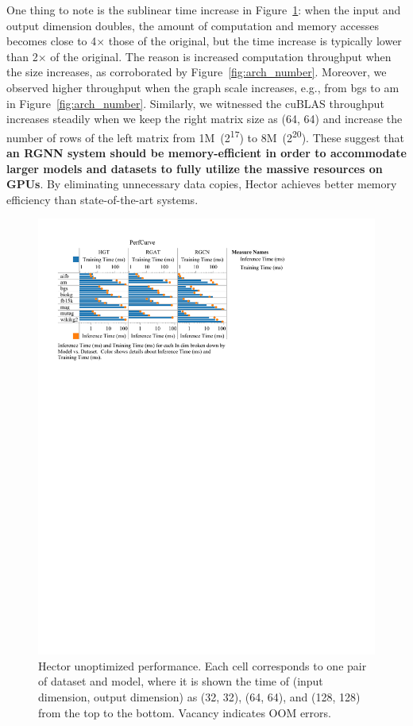 One thing to note is the sublinear time increase in Figure~\ref{fig:perf_curve}: when the input and output dimension doubles, the amount of computation and memory accesses becomes close to 4$\times$ those of the original, but the time increase is typically lower than 2$\times$ of the original. The reason is increased computation throughput when the size increases, as corroborated by Figure~\ref{fig:arch_number}. Moreover, we observed higher throughput when the graph scale increases, e.g., from bgs to am in Figure~\ref{fig:arch_number}. Similarly, we witnessed the cuBLAS throughput increases steadily when we keep the right matrix size as (64, 64) and increase the number of rows of the left matrix from 1M~(2\textsuperscript{17}) to 8M~(2\textsuperscript{20}). These suggest that \textbf{an RGNN system should be memory-efficient in order to accommodate larger models and datasets to fully utilize the massive resources on GPUs}. By eliminating unnecessary data copies, Hector achieves better memory efficiency than state-of-the-art systems.



\begin{figure}[!htbp]
\centering
\includegraphics[width=\linewidth]{figures/Hector/HeteroRGNNPerfCurve.pdf}
\caption{\label{fig:perf_curve}Hector unoptimized performance. Each cell corresponds to one pair of dataset and model, where it is shown the time of (input dimension, output dimension) as (32, 32), (64, 64), and (128, 128) from the top to the bottom. Vacancy indicates OOM errors.}
\end{figure}


